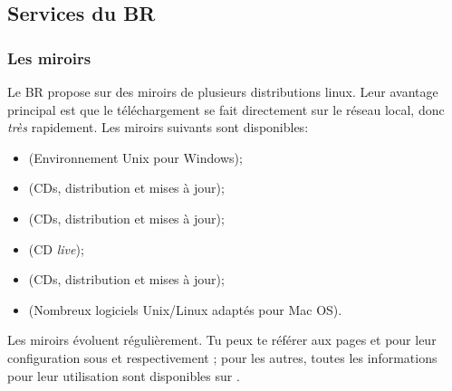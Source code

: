 \subsection{Services du BR}


\subsubsection{Les miroirs}
Le BR propose sur  des miroirs de plusieurs distributions linux. Leur avantage principal est que le téléchargement se fait directement sur le réseau local, donc \emph{très} rapidement.
Les miroirs suivants sont disponibles:

\begin{itemize}
\item {} (Environnement Unix pour Windows);
\item {} (CDs, distribution et mises à jour);
\item {} (CDs, distribution et mises à jour);
\item {} (CD \emph{live});
\item {} (CDs, distribution et mises à jour);
\item {} (Nombreux logiciels Unix/Linux adaptés pour Mac OS).
\end{itemize}


Les miroirs évoluent régulièrement. Tu peux te référer aux pages \pageref{gentoo_mirror} et \pageref{ubuntu_mirror} pour leur configuration sous  et  respectivement ; pour les autres, toutes les informations pour leur utilisation sont disponibles sur .
